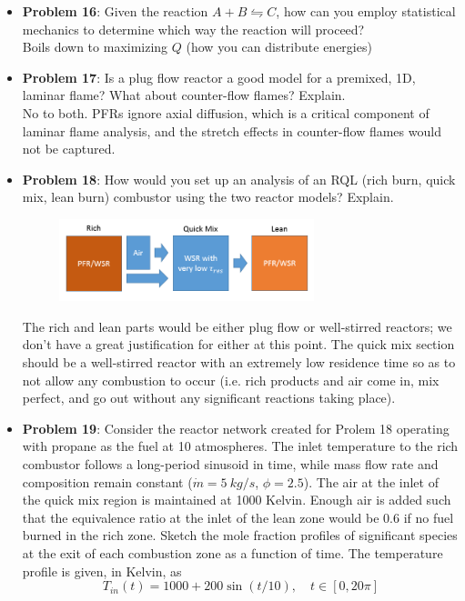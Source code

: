 \documentclass[11pt]{article}
\newcommand{\Item}[1]{\item \textbf{#1}:}
\newcommand{\Problem}[1]{\Item{Problem #1}}
\begin{document}
\begin{itemize}
\Problem{16} Given the reaction $A+B\leftrightharpoons C$, how can you employ statistical mechanics to determine which way the reaction will proceed?\\

Boils down to maximizing $Q$ (how you can distribute energies)

\Problem{17} Is a plug flow reactor a good model for a premixed, 1D, laminar flame? What about counter-flow flames? Explain.\\

No to both. PFRs ignore axial diffusion, which is a critical component of laminar flame analysis, and the stretch effects in counter-flow flames would not be captured.

\Problem{18} How would you set up an analysis of an RQL (rich burn, quick mix, lean burn) combustor using the two reactor models? Explain.

\begin{figure}[h]\centering\includegraphics[width=0.7\textwidth]{Graphics/RQL_network.PNG}\end{figure}

The rich and lean parts would be either plug flow or well-stirred reactors; we don't have a great justification for either at this point. The quick mix section should be a well-stirred reactor with an extremely low residence time so as to not allow any combustion to occur (i.e. rich products and air come in, mix perfect, and go out without any significant reactions taking place).

\Problem{19} Consider the reactor network created for Prolem 18 operating with propane as the fuel at 10 atmospheres. The inlet temperature to the rich combustor follows a long-period sinusoid in time, while mass flow rate and composition remain constant ($\dot m = 5\ kg/s$, $\phi=2.5$). The air at the inlet of the quick mix region is maintained at 1000 Kelvin. Enough air is added such that the equivalence ratio at the inlet of the lean zone would be 0.6 if no fuel burned in the rich zone. Sketch the mole fraction profiles of significant species at the exit of each combustion zone as a function of time. The temperature profile is given, in Kelvin, as
$$T_{in}(t) = 1000 + 200\sin(t/10),\quad t\in[0,20\pi]$$

\end{itemize}
\end{document}

